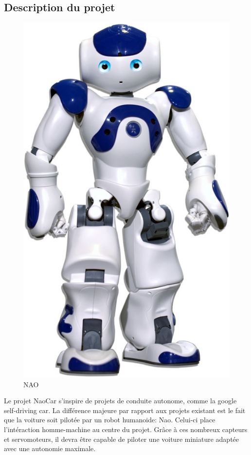 \documentclass[11pt]{report} %
\begin{document}
		\subsection{Description du projet}
			\begin{figure}[htb]
			\centering
			\includegraphics[scale=0.2]{nao2.jpg}
			\caption{NAO}
			\label{fig:nao}
			\end{figure}
		Le projet NaoCar s'inspire de projets de conduite autonome, comme la google self-driving car. La différence majeure par rapport aux projets existant est le fait que la voiture soit pilotée par un robot humanoide: Nao. Celui-ci place l'intéraction homme-machine au centre du projet. Grâce à ces nombreux capteurs et servomoteurs, il devra être capable de piloter une voiture miniature adaptée avec une autonomie maximale.
\end{document}
